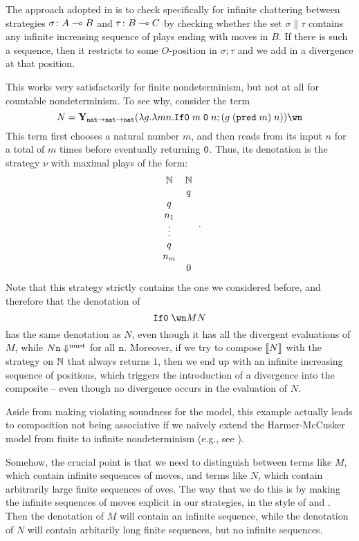 \documentclass[sigplan,10pt,review]{acmart}\settopmatter{printfolios=true,printccs=false,printacmref=false}
\begin{document}
The approach adopted in \cite{mcCHFiniteND} is to check specifically for infinite chattering between strategies $\sigma\colon A\multimap B$ and $\tau\colon B\multimap C$ by checking whether the set $\sigma\|\tau$ contains any infinite increasing sequence of plays ending with moves in $B$.  
If there is such a sequence, then it restricts to some $O$-position in $\sigma;\tau$ and we add in a divergence at that position.  

This works very satisfactorily for finite nondeterminism, but not at all for countable nondeterminism.  
To see why, consider the term
\[
  N = \Y_{\nat\to\nat\to\nat}(\lambda g.\lambda m n.\IfO m\;\0\;n;(g\;(\pred m)\;n))\wn
  \]
This term first chooses a natural number $m$, and then reads from its input $n$ for a total of $m$ times before eventually returning ${\mathtt{0}}$.  
Thus, its denotation is the strategy $\nu$ with maximal plays of the form:
\[
  \begin{array}{cc}
    \mathbf{\mathbb{N}} & \mathbf{\mathbb{N}} \\
    & q \\
    q & \\
    n_1 & \\
    \vdots & \\
    q & \\
    n_m & \\
    & 0
  \end{array}\,.
  \]
Note that this strategy strictly contains the one we considered before, and therefore that the denotation of
\[
  \IfO \wn M N
  \]
has the same denotation as $N$, even though it has all the divergent evaluations of $M$, while $N{\mathtt{n}}\Downarrow^{\text{must}}$ for all ${\mathtt{n}}$.
Moreover, if we try to compose $\left\llbracket N\right\rrbracket$ with the strategy on $\mathbb{N}$ that always returns $1$, then we end up with an infinite increasing sequence of positions, which triggers the introduction of a divergence into the composite -- even though no divergence occurs in the evaluation of $N$.

Aside from making violating soundness for the model, this example actually leads to composition not being associative if we naively extend the Harmer-McCusker model from finite to infinite nondeterminism (e.g., see \cite[4.4.1]{RusssThesis}).  

Somehow, the crucial point is that we need to distinguish between terms like $M$, which contain infinite sequences of moves, and terms like $N$, which contain arbitrarily large finite sequences of oves.  
The way that we do this is by making the infinite sequences of moves explicit in our strategies, in the style of \cite{RoscoeCspInfinite} and \cite{LevyGsInfinite}.  
Then the denotation of $M$ will contain an infinite sequence, while the denotation of $N$ will contain arbitarily long finite sequences, but no infinite sequences.  
\end{document}
